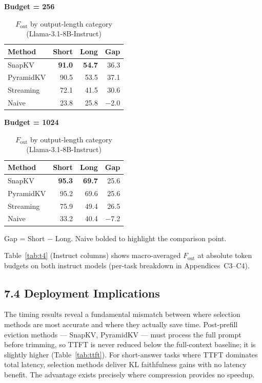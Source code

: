 \documentclass[10pt,letterpaper]{article}
\begin{document}
\begin{table}[H]
\centering
\small
\caption{\(F_{\text{out}}\) by output-length category (Llama-3.1-8B-Instruct)}
\label{tab:instruct-fout-shortlong}
\begin{minipage}[t]{0.47\textwidth}
\centering
\textbf{Budget = 256}\\[4pt]
\begin{tabular}{@{}lrrr@{}}
\toprule
Method & Short & Long & Gap\\
\midrule
SnapKV    & \textbf{91.0} & \textbf{54.7} & 36.3\\
PyramidKV & 90.5 & 53.5 & 37.1\\
Streaming & 72.1 & 41.5 & 30.6\\
Naive     & 23.8 & 25.8 & $-$2.0\\
\bottomrule
\end{tabular}
\end{minipage}
\hfill
\begin{minipage}[t]{0.47\textwidth}
\centering
\textbf{Budget = 1024}\\[4pt]
\begin{tabular}{@{}lrrr@{}}
\toprule
Method & Short & Long & Gap\\
\midrule
SnapKV    & \textbf{95.3} & \textbf{69.7} & 25.6\\
PyramidKV & 95.2 & 69.6 & 25.6\\
Streaming & 75.9 & 49.4 & 26.5\\
Naive     & 33.2 & 40.4 & $-$7.2\\
\bottomrule
\end{tabular}
\end{minipage}

\medskip
Gap = Short $-$ Long.  Naive bolded to highlight the comparison point.
\end{table}

Table~\ref{tab:t4} (Instruct columns) shows macro-averaged \(F_{\text{out}}\) at absolute token budgets on both instruct models (per-task breakdown in Appendices~C3--C4).

\subsection{7.4 Deployment Implications}\label{deployment-implications}

The timing results reveal a fundamental mismatch between where selection methods
are most accurate and where they actually save time. Post-prefill eviction methods
--- SnapKV, PyramidKV --- must process the full prompt before trimming, so TTFT is
never reduced below the full-context baseline; it is slightly higher
(Table~\ref{tab:ttft}). For short-answer tasks where TTFT dominates total latency,
selection methods deliver KL faithfulness gains with no latency benefit. The
advantage exists precisely where compression provides no speedup.
\end{document}

